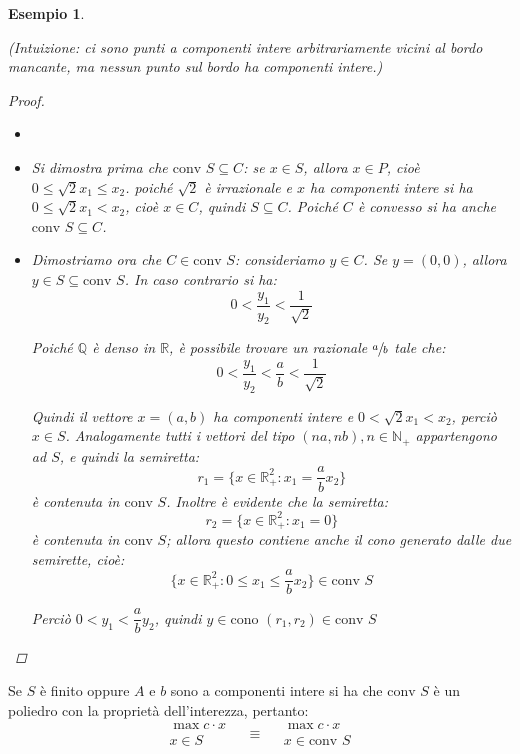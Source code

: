 \documentclass[a4paper,11pt]{book}
\newcommand{\reals}{\mathbb{R}}
\newcommand{\naturals}{\mathbb{N}}
\theoremstyle{break}
\newtheorem{es}[deff]{Esempio}
\begin{document}
\begin{es}
\begin{multicols}{2}
 \end{multicols}

 \begin{center}
 \end{center}
\footnotesize (Intuizione: ci sono punti a componenti intere arbitrariamente vicini al bordo mancante, ma nessun punto sul bordo ha componenti intere.)\normalsize
 \begin{proof} \footnotesize \begin{itemize}
                \item []
                \item 
  Si dimostra prima che $\text{conv } S \subseteq C$: se $x \in S$, allora $x \in P$, cioè $0\leq \sqrt{2} x_1 \leq x_2$. poiché $\sqrt 2$ è irrazionale e $x$ ha componenti intere si ha $0\leq \sqrt{2} x_1 < x_2$, cioè $x \in C$, quindi $S \subseteq C$. Poiché $C$ è convesso si ha anche $\text{conv }S \subseteq C$.
  \item Dimostriamo ora che $C \in \text{conv }S$: consideriamo $y \in C$. Se $y = (0,0)$, allora $y \in S \subseteq \text{conv } S$. In caso contrario si ha:
 \[0 < \frac{y_1}{y_2} < \frac{1}{\sqrt{2}}\]
 
 Poiché $\mathbb{Q}$ è denso in $\reals$, è possibile trovare un razionale $\sfrac{a}{b}$ tale che:
 \[0 < \frac{y_1}{y_2} < \frac{a}{b} < \frac{1}{\sqrt{2}}\]
  
  Quindi il vettore $x = (a, b)$ ha componenti intere e $0 < \sqrt{2} x_1 < x_2$, perciò $x \in S$. Analogamente tutti i vettori del tipo $(na, nb), n \in \naturals_+$ appartengono ad $S$, e quindi la semiretta:
  \[r_1 = \Big\{x \in \reals^2_+ : x_1 = \frac{a}{b} x_2\Big\}\]
  è contenuta in $\text{conv }S$. Inoltre è evidente che la semiretta:
  \[r_2 =  \{x \in \reals^2_+ : x_1 = 0\}\]
  è contenuta in $\text{conv }S$; allora questo contiene anche il cono generato dalle due semirette, cioè:
  \[\Big\{ x \in \reals^2_+ : 0 \leq x_1 \leq \dfrac{a}{b} x_2 \Big\} \in \text{conv }S\]
  
  Perciò $0 < y_1 < \dfrac{a}{b}y_2$, quindi $y \in \text{cono }(r_1, r_2) \in \text{conv } S$
               \end{itemize}
 
 
 \end{proof}

\end{es}
\smallskip

Se $S$ è finito oppure $A$ e $b$ sono a componenti intere si ha che $\text{conv }S$ è un poliedro con la proprietà dell'interezza, pertanto:
\[\begin{matrix}
   \max c\cdot x\\
   x \in S
  \end{matrix}\quad \equiv \quad\begin{matrix}
   \max c\cdot x\\
   x \in \text{conv }S
  \end{matrix}
\]
\end{document}
